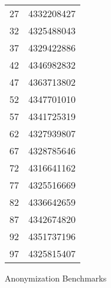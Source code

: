 \begin{figure}[H]
\begin{tabular}{r r}
        27 & 4332208427 \\
        32 & 4325488043 \\
        37 & 4329422886 \\
        42 & 4346982832 \\
        47 & 4363713802 \\
        52 & 4347701010 \\
        57 & 4341725319 \\
        62 & 4327939807 \\
        67 & 4328785646 \\
        72 & 4316641162 \\
        77 & 4325516669 \\
        82 & 4336642659 \\
        87 & 4342674820 \\
        92 & 4351737196 \\
        97 & 4325815407 \\
        \bottomrule
    \end{tabular}
    \caption{Anonymization Benchmarks}
\end{figure}
